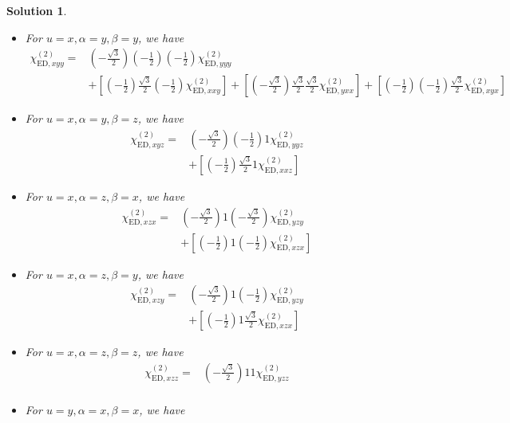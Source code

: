 \documentclass[UTF8,10pt,a4paper]{article}
\theoremstyle{Problem}
\theoremstyle{Solution}
\newtheorem*{sol}{Solution}
\begin{document}
\begin{sol}
\begin{itemize}
\begin{align}
\end{align}\normalsize
\item For $u=x,\alpha=y,\beta=y$, we have
\small\begin{align}
\nonumber\chi_{\text{ED},xyy}^{(2)}=&\left(-\frac{\sqrt{3}}{2}\right)\left(-\frac{1}{2}\right)\left(-\frac{1}{2}\right)\chi_{\text{ED},yyy}^{(2)}\\
&+\left[\left(-\frac{1}{2}\right)\frac{\sqrt{3}}{2}\left(-\frac{1}{2}\right)\chi_{\text{ED},xxy}^{(2)}\right]+\left[\left(-\frac{\sqrt{3}}{2}\right)\frac{\sqrt{3}}{2}\frac{\sqrt{3}}{2}\chi_{\text{ED},yxx}^{(2)}\right]+\left[\left(-\frac{1}{2}\right)\left(-\frac{1}{2}\right)\frac{\sqrt{3}}{2}\chi_{\text{ED},xyx}^{(2)}\right]
\end{align}\normalsize
\item For $u=x,\alpha=y,\beta=z$, we have
\small\begin{align}
\nonumber\chi_{\text{ED},xyz}^{(2)}=&\left(-\frac{\sqrt{3}}{2}\right)\left(-\frac{1}{2}\right)1\chi_{\text{ED},yyz}^{(2)}\\
&+\left[\left(-\frac{1}{2}\right)\frac{\sqrt{3}}{2}1\chi_{\text{ED},xxz}^{(2)}\right]
\end{align}\normalsize
\item For $u=x,\alpha=z,\beta=x$, we have
\small\begin{align}
\nonumber\chi_{\text{ED},xzx}^{(2)}=&\left(-\frac{\sqrt{3}}{2}\right)1\left(-\frac{\sqrt{3}}{2}\right)\chi_{\text{ED},yzy}^{(2)}\\
&+\left[\left(-\frac{1}{2}\right)1\left(-\frac{1}{2}\right)\chi_{\text{ED},xzx}^{(2)}\right]
\end{align}\normalsize
\item For $u=x,\alpha=z,\beta=y$, we have
\small\begin{align}
\nonumber\chi_{\text{ED},xzy}^{(2)}=&\left(-\frac{\sqrt{3}}{2}\right)1\left(-\frac{1}{2}\right)\chi_{\text{ED},yzy}^{(2)}\\
&+\left[\left(-\frac{1}{2}\right)1\frac{\sqrt{3}}{2}\chi_{\text{ED},xzx}^{(2)}\right]
\end{align}\normalsize
\item For $u=x,\alpha=z,\beta=z$, we have
\small\begin{align}
\nonumber\chi_{\text{ED},xzz}^{(2)}=&\left(-\frac{\sqrt{3}}{2}\right)11\chi_{\text{ED},yzz}^{(2)}\\
&
\end{align}\normalsize
\item For $u=y,\alpha=x,\beta=x$, we have
\small\begin{align}

\end{align}
\end{itemize}
\end{sol}
\end{document}

